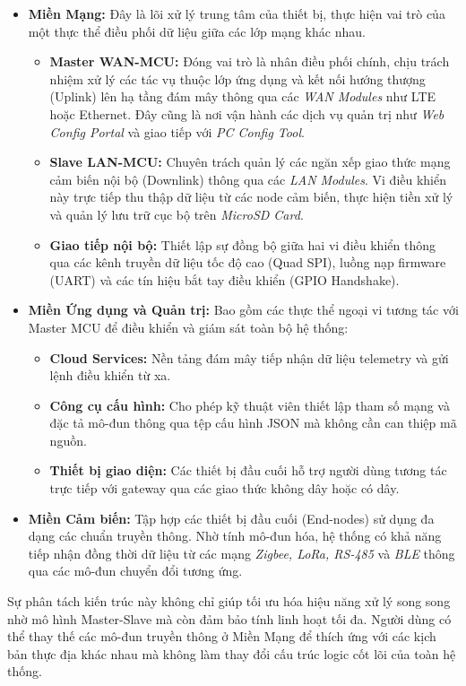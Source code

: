     \begin{itemize}
        \item \textbf{Miền Mạng:} Đây là lõi xử lý trung tâm của thiết bị, thực hiện vai trò của một thực thể điều phối dữ liệu giữa các lớp mạng khác nhau.
        \begin{itemize}
            \item \textbf{Master WAN-MCU:} Đóng vai trò là nhân điều phối chính, chịu trách nhiệm xử lý các tác vụ thuộc lớp ứng dụng và kết nối hướng thượng (Uplink) lên hạ tầng đám mây thông qua các \textit{WAN Modules} như LTE hoặc Ethernet. Đây cũng là nơi vận hành các dịch vụ quản trị như \textit{Web Config Portal} và giao tiếp với \textit{PC Config Tool}.
            \item \textbf{Slave LAN-MCU:} Chuyên trách quản lý các ngăn xếp giao thức mạng cảm biến nội bộ (Downlink) thông qua các \textit{LAN Modules}. Vi điều khiển này trực tiếp thu thập dữ liệu từ các node cảm biến, thực hiện tiền xử lý và quản lý lưu trữ cục bộ trên \textit{MicroSD Card}.
            \item \textbf{Giao tiếp nội bộ:} Thiết lập sự đồng bộ giữa hai vi điều khiển thông qua các kênh truyền dữ liệu tốc độ cao (Quad SPI), luồng nạp firmware (UART) và các tín hiệu bắt tay điều khiển (GPIO Handshake).
        \end{itemize}

        \item \textbf{Miền Ứng dụng và Quản trị:} Bao gồm các thực thể ngoại vi tương tác với Master MCU để điều khiển và giám sát toàn bộ hệ thống:
        \begin{itemize}
            \item \textbf{Cloud Services:} Nền tảng đám mây tiếp nhận dữ liệu telemetry và gửi lệnh điều khiển từ xa.
            \item \textbf{Công cụ cấu hình:} Cho phép kỹ thuật viên thiết lập tham số mạng và đặc tả mô-đun thông qua tệp cấu hình JSON mà không cần can thiệp mã nguồn.
            \item \textbf{Thiết bị giao diện:} Các thiết bị đầu cuối hỗ trợ người dùng tương tác trực tiếp với gateway qua các giao thức không dây hoặc có dây.
        \end{itemize}

        \item \textbf{Miền Cảm biến:} Tập hợp các thiết bị đầu cuối (End-nodes) sử dụng đa dạng các chuẩn truyền thông. Nhờ tính mô-đun hóa, hệ thống có khả năng tiếp nhận đồng thời dữ liệu từ các mạng \textit{Zigbee, LoRa, RS-485} và \textit{BLE} thông qua các mô-đun chuyển đổi tương ứng.
    \end{itemize}

    Sự phân tách kiến trúc này không chỉ giúp tối ưu hóa hiệu năng xử lý song song nhờ mô hình Master-Slave mà còn đảm bảo tính linh hoạt tối đa. Người dùng có thể thay thế các mô-đun truyền thông ở Miền Mạng để thích ứng với các kịch bản thực địa khác nhau mà không làm thay đổi cấu trúc logic cốt lõi của toàn hệ thống.
